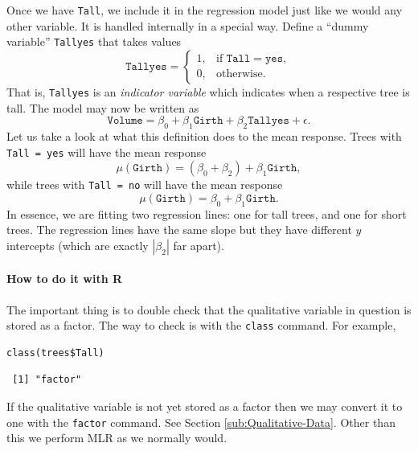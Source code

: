 \documentclass[captions=tableheading]{scrbook}
\begin{document}
Once we have \texttt{Tall}, we include it in the regression model just like we would any other variable. It is handled internally in a special way. Define a ``dummy variable'' \texttt{Tallyes} that takes values
\begin{equation}
\mathtt{Tallyes}=
\begin{cases}
1, & \mbox{if }\mathtt{Tall}=\mathtt{yes},\\
0, & \mbox{otherwise.}
\end{cases}
\end{equation}
That is, \texttt{Tallyes} is an \emph{indicator variable} which indicates when a respective tree is tall. The model may now be written as 
\begin{equation}
\mathtt{Volume}=\beta_{0}+\beta_{1}\mathtt{Girth}+\beta_{2}\mathtt{Tallyes}+\epsilon.
\end{equation}
Let us take a look at what this definition does to the mean response. Trees with \texttt{Tall = yes} will have the mean response
\begin{equation}
\mu(\mathtt{Girth})=(\beta_{0}+\beta_{2})+\beta_{1}\mathtt{Girth},
\end{equation}
while trees with \texttt{Tall = no} will have the mean response
\begin{equation} 
\mu(\mathtt{Girth})=\beta_{0}+\beta_{1}\mathtt{Girth}.
\end{equation}
In essence, we are fitting two regression lines: one for tall trees, and one for short trees. The regression lines have the same slope but they have different \(y\) intercepts (which are exactly \(|\beta_{2}|\) far apart).

\paragraph*{How to do it with \textsf{R}}

The important thing is to double check that the qualitative variable in question is stored as a factor. The way to check is with the \texttt{class} command. For example,


\begin{verbatim}
class(trees$Tall)
\end{verbatim}

\begin{verbatim}
 [1] "factor"
\end{verbatim}

If the qualitative variable is not yet stored as a factor then we may convert it to one with the \texttt{factor} command. See Section \ref{sub:Qualitative-Data}. Other than this we perform MLR as we normally would.
\end{document}
